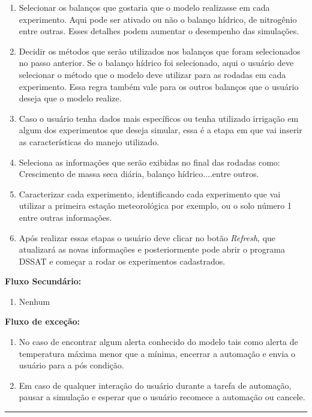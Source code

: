 \documentclass[tg]{mdtufsm}
\begin{document}
\begin{enumerate}
                		\item Selecionar os balanços que gostaria que o modelo realizasse em cada experimento. Aqui pode ser ativado ou não o balanço hídrico, de nitrogênio entre outras. Esses detalhes podem aumentar o desempenho das simulações.
                		\item Decidir os métodos que serão utilizados nos balanços que foram selecionados no passo anterior. Se o balanço hídrico foi selecionado, aqui o usuário deve selecionar o método que o modelo deve utilizar para as rodadas em cada experimento. Essa regra também vale para os outros balanços que o usuário deseja que o modelo realize.
                		\item Caso o usuário tenha dados mais específicos ou tenha utilizado irrigação em algum dos experimentos que deseja simular, essa é a etapa em que vai inserir as características do manejo utilizado.
                		\item Seleciona as informações que serão exibidas no final das rodadas como: Crescimento de massa seca diária, balanço hídrico....entre outros.
                		\item Caracterizar cada experimento, identificando cada experimento que vai utilizar a primeira estação meteorológica por exemplo, ou o solo número 1 entre outras informações.
                		\item Após realizar essas etapas o usuário deve clicar no botão \emph{Refresh}, que atualizará as novas informações e posteriormente pode abrir o programa DSSAT e começar a rodar os experimentos cadastrados.
                	\end{enumerate}

                {\bf Fluxo Secundário:}
                	\begin{enumerate}
                		\item Nenhum
                	\end{enumerate}

                {\bf Fluxo de exceção:}
                	\begin{enumerate}
                		\item No caso de encontrar algum alerta conhecido do modelo tais como alerta de temperatura máxima menor que a mínima, encerrar a automação e envia o usuário para a pós condição.
                		\item Em caso de qualquer interação do usuário durante a tarefa de automação, pausar a simulação e esperar que o usuário recomece a automação ou cancele.
                	\end{enumerate}
            	\bigskip \hrule \bigskip
\end{document}

